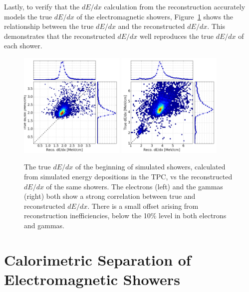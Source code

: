 Lastly, to verify that the $dE/dx$ calculation from the reconstruction accurately models the true $dE/dx$ of the electromagnetic showers, Figure~\ref{fig:true_dedx} shows the relationship between the true $dE/dx$ and the reconstructed $dE/dx$.  This demonstrates that the reconstructed $dE/dx$ well reproduces the true $dE/dx$ of each shower.

\begin{figure}[htb]
  \centering
  \includegraphics[width=0.45\textwidth]{emshower_figures/e_true_reco_dedx_4cm.png}
  \includegraphics[width=0.45\textwidth]{emshower_figures/p_true_reco_dedx_4cm.png}
  \caption{The true $dE/dx$ of the beginning of simulated showers, calculated from simulated energy depositions in the TPC, vs the reconstructed $dE/dx$ of the same showers.  The electrons (left) and the gammas (right) both show a strong correlation between true and reconstructed $dE/dx$. There is a small offset arising from reconstruction inefficiencies, below the 10\% level in both electrons and gammas.}
  \label{fig:true_dedx}
\end{figure}

\FloatBarrier

\section{\label{sec:argo_dedx} Calorimetric Separation of Electromagnetic Showers}

